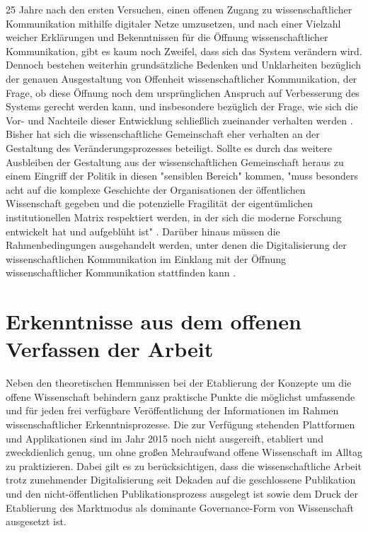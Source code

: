 25 Jahre nach den ersten Versuchen, einen offenen Zugang zu wissenschaftlicher Kommunikation mithilfe digitaler Netze umzusetzen, und nach einer Vielzahl weicher Erklärungen und Bekenntnissen für die Öffnung wissenschaftlicher Kommunikation, gibt es kaum noch Zweifel, dass sich das System verändern wird. Dennoch bestehen weiterhin grundsätzliche Bedenken und Unklarheiten bezüglich der genauen Ausgestaltung von Offenheit wissenschaftlicher Kommunikation, der Frage, ob diese Öffnung noch dem ursprünglichen Anspruch auf Verbesserung des Systems gerecht werden kann, und insbesondere bezüglich der Frage, wie sich die Vor- und Nachteile dieser Entwicklung schließlich zueinander verhalten werden \cite{hagner_2015_sache_buches}. Bisher hat sich die wissenschaftliche Gemeinschaft eher verhalten an der Gestaltung des Veränderungsprozesses beteiligt. Sollte es durch das weitere Ausbleiben der Gestaltung aus der wissenschaftlichen Gemeinschaft heraus zu einem Eingriff der Politik in diesen "sensiblen Bereich" kommen, "muss besonders acht auf die komplexe Geschichte der Organisationen der öffentlichen Wissenschaft gegeben und die potenzielle Fragilität der eigentümlichen institutionellen Matrix respektiert werden, in der sich die moderne Forschung entwickelt hat und aufgeblüht ist" \cite{David_1998}. Darüber hinaus müssen die Rahmenbedingungen ausgehandelt werden, unter denen die Digitalisierung der wissenschaftlichen Kommunikation im Einklang mit der Öffnung wissenschaftlicher Kommunikation stattfinden kann \cite{mennes_2013_making_os}.

\section{Erkenntnisse aus dem offenen Verfassen der Arbeit}

Neben den theoretischen Hemmnissen bei der Etablierung der Konzepte um die offene Wissenschaft behindern ganz praktische Punkte die möglichst umfassende und für jeden frei verfügbare Veröffentlichung der Informationen im Rahmen wissenschaftlicher Erkenntnisprozesse. Die zur Verfügung stehenden Plattformen und Applikationen sind im Jahr 2015 noch nicht ausgereift, etabliert und zweckdienlich genug, um ohne großen Mehraufwand offene Wissenschaft im Alltag zu praktizieren. Dabei gilt es zu berücksichtigen, dass die wissenschaftliche Arbeit trotz zunehmender Digitalisierung seit Dekaden auf die geschlossene Publikation und den nicht-öffentlichen Publikationsprozess ausgelegt ist sowie dem Druck der Etablierung des Marktmodus als dominante Governance-Form von Wissenschaft ausgesetzt ist.

